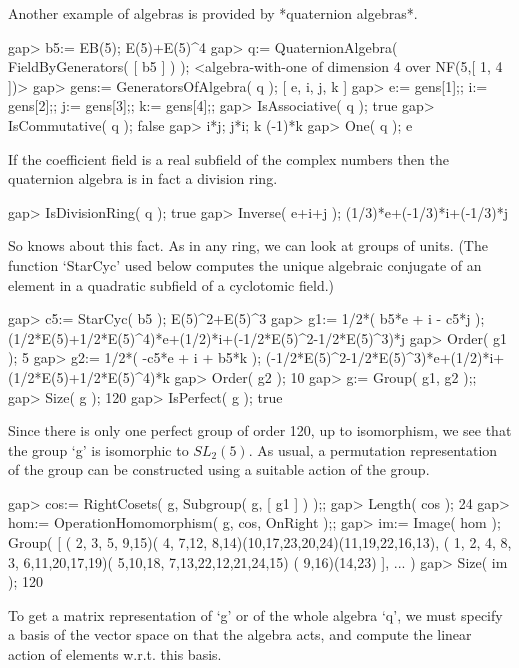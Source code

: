 Another example of algebras is provided by *quaternion algebras*.

\beginexample
    gap> b5:= EB(5);
    E(5)+E(5)^4
    gap> q:= QuaternionAlgebra( FieldByGenerators( [ b5 ] ) );
    <algebra-with-one of dimension 4 over NF(5,[ 1, 4 ])>
    gap> gens:= GeneratorsOfAlgebra( q );
    [ e, i, j, k ]
    gap> e:= gens[1];; i:= gens[2];; j:= gens[3];; k:= gens[4];;
    gap> IsAssociative( q );
    true
    gap> IsCommutative( q );
    false
    gap> i*j; j*i;
    k
    (-1)*k
    gap> One( q );
    e
\endexample

If the coefficient field is a real subfield of the complex numbers
then the quaternion algebra is in fact a division ring.

\beginexample
    gap> IsDivisionRing( q );
    true
    gap> Inverse( e+i+j );
    (1/3)*e+(-1/3)*i+(-1/3)*j
\endexample

So {\GAP} knows about this fact.
As in any ring, we can look at groups of units.
(The function `StarCyc' used below computes the unique algebraic
conjugate of an element in a quadratic subfield of a cyclotomic field.)

\beginexample
    gap> c5:= StarCyc( b5 );
    E(5)^2+E(5)^3
    gap> g1:= 1/2*( b5*e + i - c5*j );
    (1/2*E(5)+1/2*E(5)^4)*e+(1/2)*i+(-1/2*E(5)^2-1/2*E(5)^3)*j
    gap> Order( g1 );
    5
    gap> g2:= 1/2*( -c5*e + i + b5*k );
    (-1/2*E(5)^2-1/2*E(5)^3)*e+(1/2)*i+(1/2*E(5)+1/2*E(5)^4)*k
    gap> Order( g2 );
    10
    gap> g:= Group( g1, g2 );;
    gap> Size( g );
    120
    gap> IsPerfect( g );
    true
\endexample

Since there is only one perfect group of order 120, up to isomorphism,
we see that the group `g' is isomorphic to $SL_2(5)$.
As usual, a permutation representation of the group can be constructed
using a suitable action of the group.

\beginexample
    gap> cos:= RightCosets( g, Subgroup( g, [ g1 ] ) );;
    gap> Length( cos );
    24
    gap> hom:= OperationHomomorphism( g, cos, OnRight );;
    gap> im:= Image( hom );
    Group( 
    [ ( 2, 3, 5, 9,15)( 4, 7,12, 8,14)(10,17,23,20,24)(11,19,22,16,13),
      ( 1, 2, 4, 8, 3, 6,11,20,17,19)( 5,10,18, 7,13,22,12,21,24,15)
        ( 9,16)(14,23) ], ... )
    gap> Size( im );
    120
\endexample

To get a matrix representation of `g' or of the whole algebra `q',
we must specify a basis of the vector space on that the algebra acts,
and compute the linear action of elements w.r.t. this basis.

